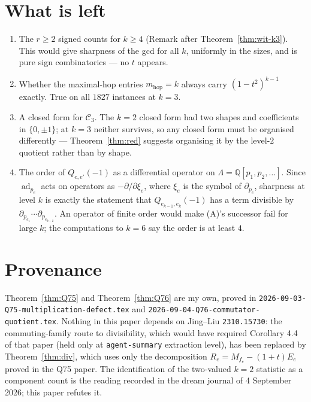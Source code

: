 \documentclass[11pt]{article}
\theoremstyle{definition}
\newcommand{\Lam}{\Lambda}
\newcommand{\Ck}{\mathcal{C}}
\begin{document}
\section{What is left}

\begin{enumerate}
\item The $r\ge2$ signed counts for $k\ge4$ (Remark after Theorem~\ref{thm:wit-k3}). This would give
sharpness of the gcd for all $k$, uniformly in the sizes, and is pure sign combinatorics --- no
$t$ appears.
\item Whether the maximal-hop entries $m_{\mathrm{hop}}=k$ always carry $(1-t^2)^{k-1}$
exactly. True on all $1827$ instances at $k=3$.
\item A closed form for $\Ck_3$. The $k=2$ closed form had two shapes and coefficients in
$\{0,\pm1\}$; at $k=3$ neither survives, so any closed form must be organised differently ---
Theorem~\ref{thm:red} suggests organising it by the level-$2$ quotient rather than by shape.
\item The order of $Q_{e,e'}(-1)$ as a differential operator on $\Lam=\mathbb{Q}[p_1,p_2,\dots]$.
Since $\operatorname{ad}_{p_e}$ acts on operators as $-\partial/\partial\xi_e$, where $\xi_e$ is
the symbol of $\partial_{p_e}$, sharpness at level $k$ is exactly the statement that
$Q_{e_{k-1},e_k}(-1)$ has a term divisible by
$\partial_{p_{e_1}}\cdots\partial_{p_{e_{k-2}}}$. An operator of finite order would make (A)'s
successor fail for large $k$; the computations to $k=6$ say the order is at least $4$.
\end{enumerate}

\section*{Provenance}

Theorem~\ref{thm:Q75} and Theorem~\ref{thm:Q76} are my own, proved in
\texttt{2026-09-03-Q75-multiplication-defect.tex} and
\texttt{2026-09-04-Q76-commutator-quotient.tex}. Nothing in this paper depends on Jing--Liu
\texttt{2310.15730}: the commuting-family route to divisibility, which would have required
Corollary 4.4 of that paper (held only at \texttt{agent-summary} extraction level), has been
replaced by Theorem~\ref{thm:div}, which uses only the decomposition
$R_e=M_{f_e}-(1+t)E_e$ proved in the Q75 paper. The identification of the two-valued $k=2$
statistic as a component count is the reading recorded in the dream journal of 4 September 2026;
this paper refutes it.
\end{document}
